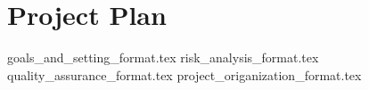 \documentclass{article}
\begin{document}

\section*{Project Plan}
{goals_and_setting_format.tex}
{risk_analysis_format.tex}
{quality_assurance_format.tex}
{project_origanization_format.tex}



\end{document}
